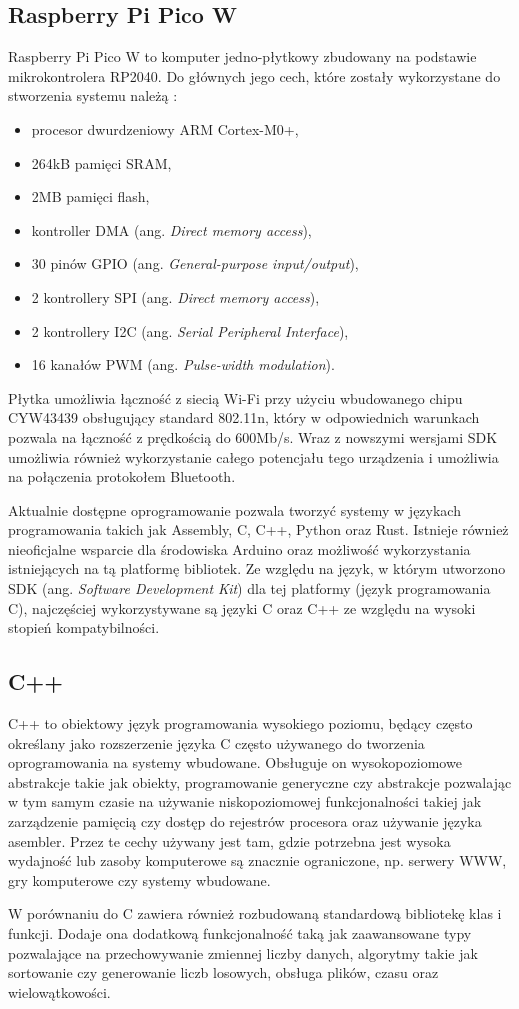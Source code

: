 \subsection*{Raspberry Pi Pico W}
Raspberry Pi Pico W to komputer jedno-płytkowy zbudowany na podstawie mikrokontrolera RP2040. 
Do głównych jego cech, które zostały wykorzystane do stworzenia systemu należą \cite{rp2040:datasheet}:
\begin{itemize}
  \item procesor dwurdzeniowy ARM Cortex-M0+,
  \item 264kB pamięci SRAM,
  \item 2MB pamięci flash,
  \item kontroller DMA (ang. \textit{Direct memory access}),
  \item 30 pinów GPIO (ang. \textit{General-purpose input/output}),
  \item 2 kontrollery SPI (ang. \textit{Direct memory access}),
  \item 2 kontrollery I2C (ang. \textit{Serial Peripheral Interface}),
  \item 16 kanałów PWM (ang. \textit{Pulse-width modulation}).
\end{itemize}
Płytka umożliwia łączność z siecią Wi-Fi przy użyciu wbudowanego chipu CYW43439
obsługujący standard 802.11n, który w odpowiednich warunkach pozwala na łączność
z prędkością do 600Mb/s. Wraz z nowszymi wersjami SDK umożliwia również wykorzystanie
całego potencjału tego urządzenia i umożliwia na połączenia protokołem Bluetooth.

Aktualnie dostępne oprogramowanie pozwala tworzyć systemy w językach programowania takich jak
Assembly, C, C++, Python oraz Rust. Istnieje również nieoficjalne wsparcie dla środowiska
Arduino oraz możliwość wykorzystania istniejących na tą platformę bibliotek.
Ze względu na język, w którym utworzono SDK (ang. \textit{Software Development Kit}) dla
tej platformy (język programowania C), najczęściej wykorzystywane są języki C oraz C++
ze względu na wysoki stopień kompatybilności.

\subsection*{C++}
C++ to obiektowy język programowania wysokiego poziomu, będący często określany jako
rozszerzenie języka C często używanego do tworzenia oprogramowania na systemy wbudowane.
Obsługuje on wysokopoziomowe abstrakcje takie jak obiekty, programowanie generyczne czy
abstrakcje pozwalając w tym samym czasie na używanie niskopoziomowej funkcjonalności 
takiej jak zarządzenie pamięcią czy dostęp do rejestrów procesora oraz używanie języka asembler.
Przez te cechy używany jest tam, gdzie potrzebna jest wysoka wydajność lub zasoby komputerowe
są znacznie ograniczone, np. serwery WWW, gry komputerowe czy systemy wbudowane.

W porównaniu do C zawiera również rozbudowaną standardową bibliotekę klas i funkcji.
Dodaje ona dodatkową funkcjonalność taką jak zaawansowane typy pozwalające na
przechowywanie zmiennej liczby danych, algorytmy takie jak sortowanie czy 
generowanie liczb losowych, obsługa plików, czasu oraz wielowątkowości.

